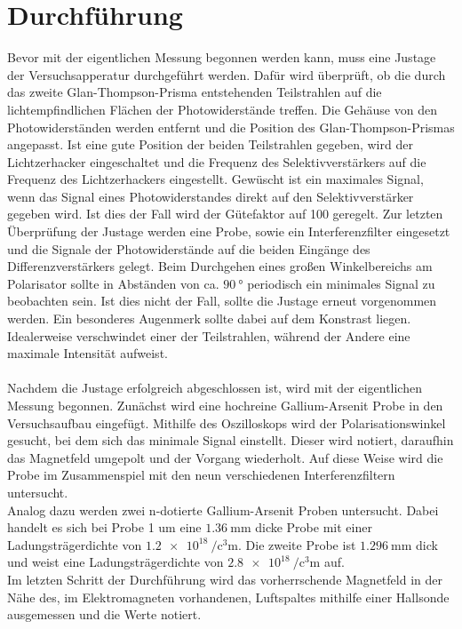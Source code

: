 \section{Durchführung}
Bevor mit der eigentlichen Messung begonnen werden kann, muss eine Justage der Versuchsapperatur durchgeführt
werden. Dafür wird überprüft, ob die durch das zweite Glan-Thompson-Prisma entstehenden Teilstrahlen auf
die lichtempfindlichen Flächen der Photowiderstände treffen. Die Gehäuse von den Photowiderständen werden
entfernt und die Position des Glan-Thompson-Prismas angepasst. Ist eine gute Position der beiden
Teilstrahlen gegeben, wird der Lichtzerhacker eingeschaltet und die Frequenz des Selektivverstärkers auf
die Frequenz des Lichtzerhackers eingestellt. Gewüscht ist ein maximales Signal, wenn das Signal eines
Photowiderstandes direkt auf den Selektivverstärker gegeben wird. Ist dies der Fall wird der
Gütefaktor auf 100 geregelt. Zur letzten Überprüfung der Justage werden eine Probe, sowie ein
Interferenzfilter eingesetzt und die Signale der Photowiderstände auf die beiden Eingänge des
Differenzverstärkers gelegt. Beim Durchgehen eines großen Winkelbereichs am Polarisator sollte in Abständen von ca.
$\SI{90}{\degree}$ periodisch ein minimales Signal zu beobachten sein. Ist dies nicht der Fall, sollte
die Justage erneut vorgenommen werden. Ein besonderes Augenmerk sollte dabei auf dem Konstrast liegen.
Idealerweise verschwindet einer der Teilstrahlen, während der Andere eine maximale Intensität aufweist. \\
\\
Nachdem die Justage erfolgreich abgeschlossen ist, wird mit der eigentlichen Messung begonnen. Zunächst
wird eine hochreine Gallium-Arsenit Probe in den Versuchsaufbau eingefügt. Mithilfe des Oszilloskops
wird der Polarisationswinkel gesucht, bei dem sich das minimale Signal einstellt. Dieser wird notiert,
daraufhin das Magnetfeld umgepolt und der Vorgang wiederholt. Auf diese Weise wird die Probe im Zusammenspiel
mit den neun verschiedenen Interferenzfiltern untersucht. \\
Analog dazu werden zwei n-dotierte Gallium-Arsenit Proben untersucht. Dabei handelt es sich bei Probe 1
um eine $\SI{1.36}{\milli\meter}$ dicke Probe mit einer Ladungsträgerdichte von
$\SI{1.2e18}{\per\cubic\centi\meter}$. Die zweite Probe ist $\SI{1.296}{\milli\meter}$ dick und weist eine
Ladungsträgerdichte von $\SI{2,8e18}{\per\cubic\centi\meter}$ auf. \\
Im letzten Schritt der Durchführung wird das vorherrschende Magnetfeld in der Nähe des, im Elektromagneten
vorhandenen, Luftspaltes mithilfe einer Hallsonde ausgemessen und die Werte notiert.
